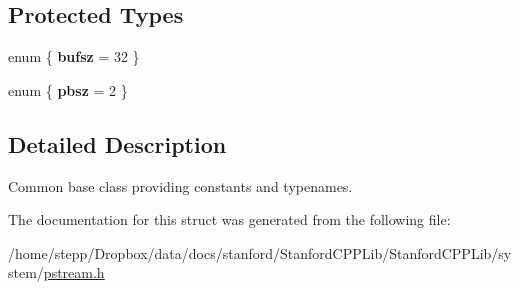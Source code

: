\subsection*{Protected Types}
\begin{DoxyCompactItemize}
\item 
\mbox{\label{structredi_1_1pstreams_a9bff4a02e7fed3943fd197d4cc3a887a}} 
enum \{ {\bfseries bufsz} = 32
 \}
\item 
\mbox{\label{structredi_1_1pstreams_af92512e6281229147c3991acc020ddaa}} 
enum \{ {\bfseries pbsz} = 2
 \}
\end{DoxyCompactItemize}


\subsection{Detailed Description}
Common base class providing constants and typenames. 

The documentation for this struct was generated from the following file\+:\begin{DoxyCompactItemize}
\item 
/home/stepp/\+Dropbox/data/docs/stanford/\+Stanford\+C\+P\+P\+Lib/\+Stanford\+C\+P\+P\+Lib/system/\mbox{\hyperlink{pstream_8h}{pstream.\+h}}\end{DoxyCompactItemize}
